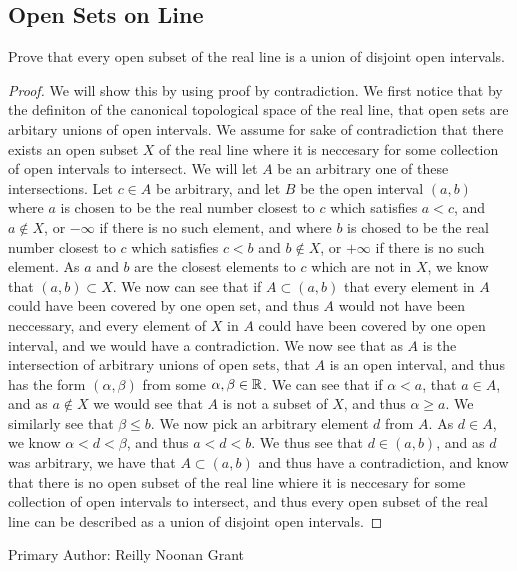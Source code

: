 \subsection{Open Sets on Line}
\begin{majorEx}
  Prove that every open subset of the real line is a union of disjoint
  open intervals.
\end{majorEx}

\begin{proof}
  We will show this by using proof by contradiction. We first notice
  that by the definiton of the canonical topological space of the real
  line, that open sets are arbitary unions of open intervals. We assume for
  sake of contradiction that there exists an open subset $X$ of the real
  line where it is neccesary for some collection of open intervals to intersect.
  We will let $A$ be an arbitrary one of these intersections. Let
  $c\in A$ be arbitrary, and let $B$ be the open interval $(a,b)$
  where $a$ is chosen to be the real number closest to $c$ which satisfies
  $a<c$, and $a\notin X$, or $-\infty$ if there is no such element,
  and where $b$ is chosed to be the real number closest to $c$ which
  satisfies $c<b$ and $b\notin X$, or $+\infty$ if there is no such
  element. As $a$ and $b$ are the closest elements to $c$ which are
  not in $X$, we know that $(a,b)\subset X$. We now can see that if
  $A\subset (a,b)$ that every element in $A$ could have been covered
  by one open set, and thus $A$ would not have been neccessary, and
  every element of $X$ in $A$ could have been covered by one open
  interval, and we would have a contradiction. We now see that as $A$
  is the intersection of arbitrary unions of open sets, that $A$ is an
  open interval, and thus has the form $(\alpha,\beta)$ from some
  $\alpha,\beta \in \mathbb{R}$. We can see that if $\alpha< a$, that $a\in
  A$, and as $a\notin X$ we would see that $A$ is not a subset of $X$,
  and thus $\alpha \geq a$. We similarly see that $\beta \leq b$. We
  now pick an arbitrary element $d$ from $A$. As $d\in A$, we know
  $\alpha < d < \beta$, and thus $a<d<b$. We thus see that $d\in
  (a,b)$, and as $d$ was arbitrary, we have that $A\subset (a,b)$  and
  thus have a contradiction, and know that there is no open subset of
  the real line whiere it is neccesary for some collection of open
  intervals to intersect, and thus  every open subset of the real line
  can be described as a union of disjoint
  open intervals.
\end{proof}

Primary Author: Reilly Noonan Grant

